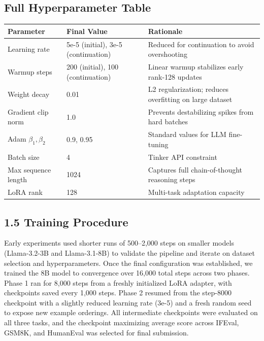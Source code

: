 \documentclass[10pt,letterpaper]{article}
\begin{document}
\subsection*{Full Hyperparameter Table}

\begin{table}[H]
\centering
\footnotesize
\begin{tabularx}{\textwidth}{llX}
\toprule
\textbf{Parameter} & \textbf{Final Value} & \textbf{Rationale} \\
\midrule
Learning rate & 5e-5 (initial), 3e-5 (continuation) & Reduced for continuation to avoid overshooting \\
Warmup steps & 200 (initial), 100 (continuation) & Linear warmup stabilizes early rank-128 updates \\
Weight decay & 0.01 & L2 regularization; reduces overfitting on large dataset \\
Gradient clip norm & 1.0 & Prevents destabilizing spikes from hard batches \\
Adam $\beta_1, \beta_2$ & 0.9, 0.95 & Standard values for LLM fine-tuning \\
Batch size & 4 & Tinker API constraint \\
Max sequence length & 1024 & Captures full chain-of-thought reasoning steps \\
LoRA rank & 128 & Multi-task adaptation capacity \\
\bottomrule
\end{tabularx}
\end{table}


\subsection{1.5 Training Procedure}
Early experiments used shorter runs of 500--2,000 steps on smaller models (Llama-3.2-3B 
and Llama-3.1-8B) to validate the pipeline and iterate on dataset selection and 
hyperparameters. Once the final configuration was established, we trained the 8B model 
to convergence over 16,000 total steps across two phases. Phase 1 ran for 8,000 steps 
from a freshly initialized LoRA adapter, with checkpoints saved every 1,000 steps. 
Phase 2 resumed from the step-8000 checkpoint with a slightly reduced learning rate 
(3e-5) and a fresh random seed to expose new example orderings. All intermediate 
checkpoints were evaluated on all three tasks, and the checkpoint maximizing average 
score across IFEval, GSM8K, and HumanEval was selected for final submission.
\end{document}
